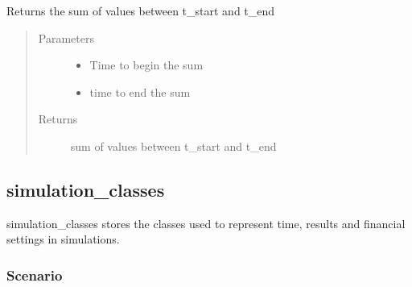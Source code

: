 \documentclass[letterpaper,10pt,english]{sphinxmanual}
\begin{document}
\begin{fulllineitems}

\begin{fulllineitems}
\label{\detokenize{index:feast.EmissionSimModules.result_classes.ResultDiscrete.get_sum_val}}
Returns the sum of values between t\_start and t\_end
\begin{quote}\begin{description}
\item[{Parameters}] \leavevmode\begin{itemize}
\item {} 
 \textendash{} Time to begin the sum

\item {} 
 \textendash{} time to end the sum

\end{itemize}

\item[{Returns}] \leavevmode
sum of values between t\_start and t\_end

\end{description}\end{quote}

\end{fulllineitems}


\end{fulllineitems}



\subsection{simulation\_classes}
\label{\detokenize{index:module-feast.EmissionSimModules.simulation_classes}}\label{\detokenize{index:simulation-classes}}
simulation\_classes stores the classes used to represent time, results and financial settings in simulations.


\subsubsection{Scenario}
\label{\detokenize{index:scenario}}
\end{document}
